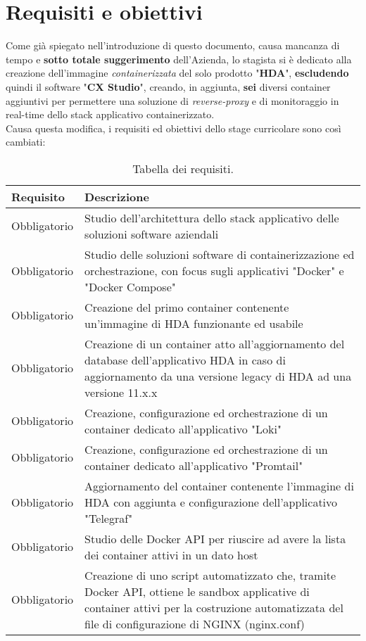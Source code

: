 \section{Requisiti e obiettivi}
Come già spiegato nell'introduzione di questo documento, causa mancanza di tempo e \textbf{sotto totale suggerimento} dell'Azienda, lo stagista si è dedicato alla creazione dell'immagine \textit{containerizzata} del solo prodotto "\textbf{HDA}", \textbf{escludendo} quindi il software "\textbf{CX Studio}", creando, in aggiunta, \textbf{sei} diversi container aggiuntivi per permettere una soluzione di \textit{reverse-proxy} e di monitoraggio in real-time dello stack applicativo containerizzato.\\
Causa questa modifica, i requisiti ed obiettivi dello stage curricolare sono così cambiati:

\begin{table}[h!]
\centering
    \renewcommand{\arraystretch}{1.5}
    \begin{tabular}{|m{}|m{}|} 
    \hline
        \hfil \textbf{Requisito} & \hfil \textbf{Descrizione} \\
    \hline\hline
        \hfil Obbligatorio & \hfil Studio dell'architettura dello stack applicativo delle soluzioni software aziendali  \\
    \hline
        \hfil Obbligatorio & \hfil Studio delle soluzioni software di containerizzazione ed orchestrazione, con focus sugli applicativi "Docker" e "Docker Compose" \\ 
    \hline
        \hfil Obbligatorio & \hfil Creazione del primo container contenente un'immagine di HDA funzionante ed usabile \\ 
    \hline
        \hfil Obbligatorio & \hfil Creazione di un container atto all'aggiornamento del database dell'applicativo HDA in caso di aggiornamento da una versione legacy di HDA ad una versione 11.x.x \\
    \hline
        \hfil Obbligatorio & \hfil Creazione, configurazione ed orchestrazione di un container dedicato all'applicativo "Loki" \\
    \hline
        \hfil Obbligatorio & \hfil Creazione, configurazione ed orchestrazione di un container dedicato all'applicativo "Promtail" \\
    \hline
        \hfil Obbligatorio & \hfil Aggiornamento del container contenente l'immagine di HDA con aggiunta e configurazione dell'applicativo "Telegraf" \\
    \hline
        \hfil Obbligatorio & \hfil Studio delle Docker API per riuscire ad avere la lista dei container attivi in un dato host \\
    \hline
        \hfil Obbligatorio & \hfil Creazione di uno script automatizzato che, tramite Docker API, ottiene le sandbox applicative di container attivi per la costruzione automatizzata del file di configurazione di NGINX (nginx.conf) \\
    \hline
    \end{tabular}
\medskip
\caption{Tabella dei requisiti.}
\label{table:tabella dei requisiti in relazione al tempo stabiliti dall'Azienda}
\end{table}

